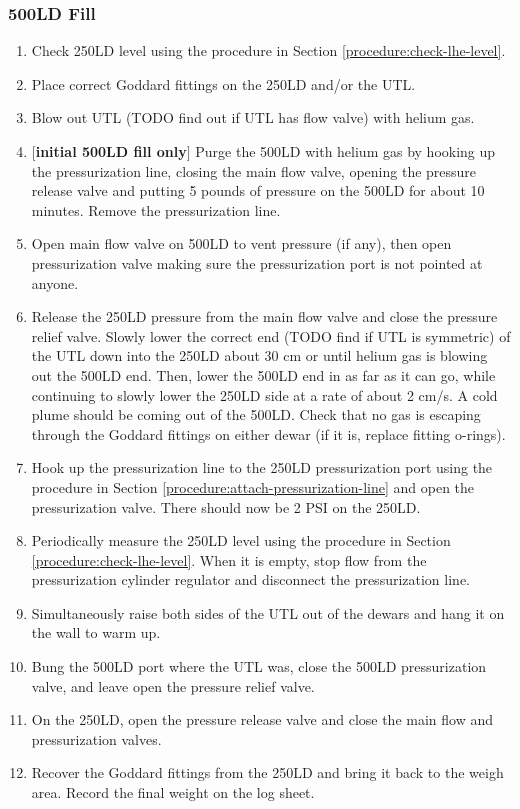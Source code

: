 \subsubsection{500LD Fill}
\begin{enumerate}
 \item Check 250LD level using the procedure in Section \ref{procedure:check-lhe-level}.
 \item Place correct Goddard fittings on the 250LD and/or the UTL.
 \item Blow out UTL (TODO find out if UTL has flow valve) with helium gas.
 \item $[$\textbf{initial 500LD fill only}$]$ Purge the 500LD with helium gas by hooking up the pressurization line, closing the main flow valve, opening the pressure release valve and putting 5 pounds of pressure on the 500LD for about 10 minutes.  Remove the pressurization line.%
 \item Open main flow valve on 500LD to vent pressure (if any), then open pressurization valve making sure the pressurization port is not pointed at anyone.
 \item Release the 250LD pressure from the main flow valve and close the pressure relief valve.  Slowly lower the correct end (TODO find if UTL is symmetric) of the UTL down into the 250LD about 30 cm or until helium gas is blowing out the 500LD end.  Then, lower the 500LD end in as far as it can go, while continuing to slowly lower the 250LD side at a rate of about 2 cm/s.  A cold plume should be coming out of the 500LD.  Check that no gas is escaping through the Goddard fittings on either dewar (if it is, replace fitting o-rings).
 \item Hook up the pressurization line to the 250LD pressurization port using the procedure in Section \ref{procedure:attach-pressurization-line} and open the pressurization valve.  There should now be 2 PSI on the 250LD.
 \item Periodically measure the 250LD level using the procedure in Section \ref{procedure:check-lhe-level}.  When it is empty, stop flow from the pressurization cylinder regulator and disconnect the pressurization line.
 \item Simultaneously raise both sides of the UTL out of the dewars and hang it on the wall to warm up.
 \item Bung the 500LD port where the UTL was, close the 500LD pressurization valve, and leave open the pressure relief valve.
 \item On the 250LD, open the pressure release valve and close the main flow and pressurization valves.
 \item Recover the Goddard fittings from the 250LD and bring it back to the weigh area.  Record the final weight on the log sheet.
\end{enumerate}

